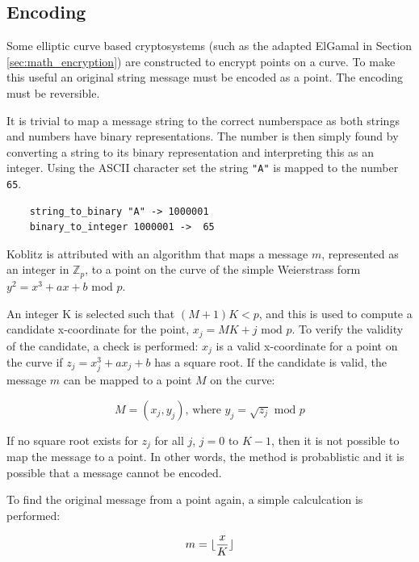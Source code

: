 \subsection{Encoding}
\label{sec:math_encoding}

Some elliptic curve based cryptosystems (such as the adapted ElGamal in Section \ref{sec:math_encryption}) are constructed to encrypt points on a curve. To make
this useful an original string message must be encoded as a point. The encoding must be reversible.

It is trivial to map a message string to the correct numberspace as both strings and numbers have binary representations. The number is then
simply found by converting a string to its binary representation and interpreting this as an integer. Using the ASCII character set the string
\verb+"A"+ is mapped to the number \verb+65+.

\begin{verbatim}
    string_to_binary "A" -> 1000001
    binary_to_integer 1000001 ->  65
\end{verbatim}

Koblitz is attributed with an algorithm that maps a message \(m\), represented as an integer in \(\mathbb{Z}_p\), to a point on the curve of the
simple Weierstrass form \(y^2 = x^3 + ax + b \text{ mod } p\).\cite{MappingAMessage}

An integer K is selected such that \((M + 1)K < p\), and this is used to compute
a candidate x-coordinate for the point, \(x_j = MK + j \text{ mod } p\). To verify the validity of the candidate, a check is performed: \(x_j\)
is a valid x-coordinate for a point on the curve if \(z_j = x_j^3 + ax_j + b\) has a square root. If the candidate is valid, the message \(m\)
can be mapped to a point \(M\) on the curve:

\begin{equation}
	M = (x_j, y_j) \text{, where } y_j = \sqrt{z_j} \text{ mod } p
\end{equation}

If no square root exists for \(z_j\) for all \(j\), \(j = 0 \text{ to } K-1\), then it is not possible to map the message to a point. In other
words, the method is probablistic and it is possible that a message cannot be encoded.

To find the original message from a point again, a simple calculcation is performed:

\begin{equation}
	m = {\lfloor {x \over K} \rfloor}
\end{equation}

